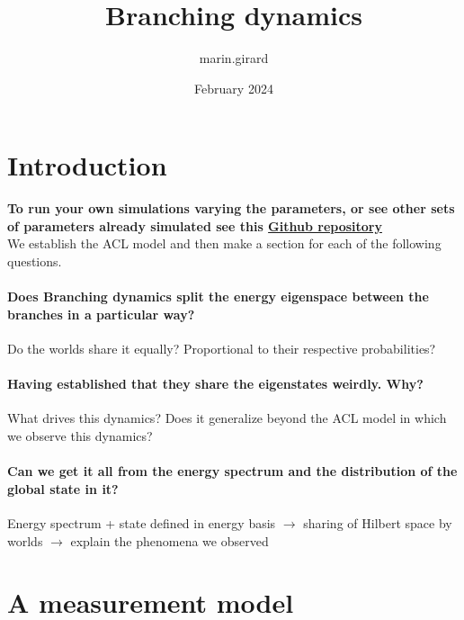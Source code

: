 \documentclass{article}
\title{Branching dynamics}
\author{marin.girard }
\date{February 2024}
\begin{document}
\maketitle

\section{Introduction}

\textbf{To run your own simulations varying the parameters, or see other sets of parameters already simulated see this
\href{http://github.com/MarinAndreGirard/Quantum_Branching}{Github repository}}\\
We establish the ACL model and then make a section for each of the following questions.

\paragraph{Does Branching dynamics split the energy eigenspace between the branches in a particular way?}
Do the worlds share it equally? Proportional to their respective probabilities?

\paragraph{Having established that they share the eigenstates weirdly. Why?}
What drives this dynamics? Does it generalize beyond the ACL model in which we observe this dynamics?

\paragraph{Can we get it all from the energy spectrum and the distribution of the global state in it?}

Energy spectrum + state defined in energy basis $\rightarrow$ sharing of Hilbert space by worlds $\rightarrow$ explain the phenomena we observed

\section{A measurement model}
\end{document}
